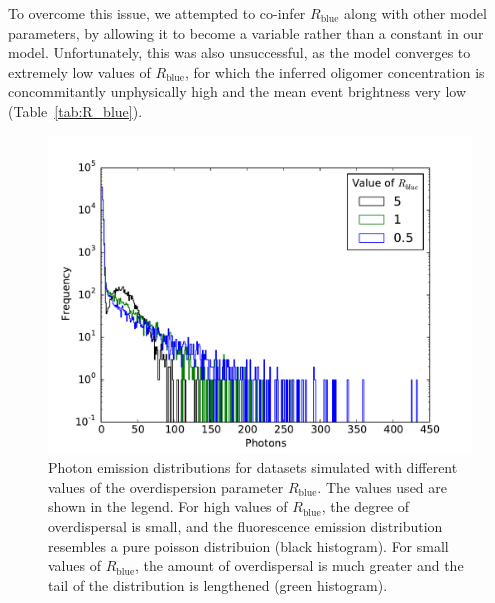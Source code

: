 To overcome this issue, we attempted to co-infer $R_{\text{blue}}$ along with other model parameters, by allowing it to become a variable rather than a constant in our model. Unfortunately, this was also unsuccessful, as the model converges to extremely low values of $R_{\text{blue}}$, for which the inferred oligomer concentration is concommitantly unphysically high and the mean event brightness very low (Table~\ref{tab:R_blue}). 


\begin{figure}
   \begin{center}
      \includegraphics*[clip=true, width=6in]{sizing/varying_R_blue.pdf}
      \caption{Photon emission distributions for datasets simulated with different values of the overdispersion parameter $R_{\text{blue}}$. The values used are shown in the legend. For high values of $R_{\text{blue}}$, the degree of overdispersal is small, and the fluorescence emission distribution resembles a pure poisson distribuion (black histogram). For small values of $R_{\text{blue}}$, the amount of overdispersal is much greater and the tail of the distribution is lengthened (green histogram).} 
      \label{fig:R_blue}
   \end{center}
\end{figure}

